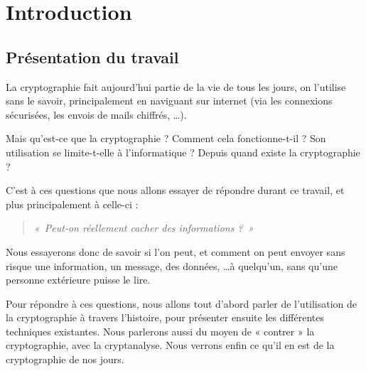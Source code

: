 \chapter{Introduction}

\section{Présentation du travail}
La cryptographie fait aujourd'hui partie de la vie de tous les jours,
on l'utilise sans le savoir, principalement en naviguant sur internet
(via les connexions sécurisées, les envois de mails chiffrés, \dots).

Mais qu'est-ce que la cryptographie ? Comment cela
fonctionne-t-il ? Son utilisation se limite-t-elle à l'informatique ?
Depuis quand existe la cryptographie ?

C'est à ces questions que nous allons essayer de répondre durant ce
travail, et plus principalement à celle-ci :

\begin{quote}
\emph{«~Peut-on réellement cacher des informations ?~»}
\end{quote}

Nous essayerons donc de savoir si l'on peut, et comment on peut 
envoyer sans risque une information, un message, des données, \dots à
quelqu'un, sans qu'une personne extérieure puisse le lire.

Pour répondre à ces questions, nous allons tout d'abord parler de
l'utilisation  de la cryptographie
à travers l'histoire, pour présenter ensuite les
différentes techniques existantes. Nous parlerons
aussi du moyen de « contrer » la cryptographie, avec la
cryptanalyse. Nous verrons enfin ce qu'il en est de la
cryptographie de nos jours. 


